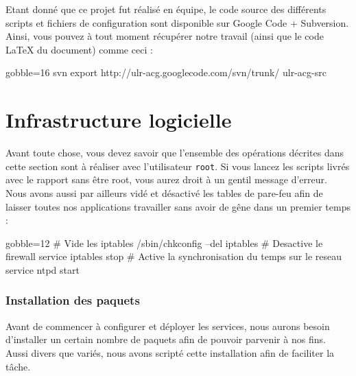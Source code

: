 \documentclass[11pt,a4paper]{report}
\begin{document}
            
            Etant donn\'e que ce projet fut r\'ealis\'e en \'equipe, le code source des diff\'erents scripts et fichiers de configuration sont disponible sur Google Code + Subversion. Ainsi, vous pouvez \`a tout moment r\'ecup\'erer notre travail (ainsi que le code {\LaTeX} du document) comme ceci :\\
            
            \begin{bashcode*}{gobble=16}
                svn export http://ulr-acg.googlecode.com/svn/trunk/ ulr-acg-src
            \end{bashcode*}
            
    \part{Infrastructure logicielle}
        
        Avant toute chose, vous devez savoir que l'ensemble des op\'erations d\'ecrites dans cette section sont \`a r\'ealiser avec l'utilisateur \verb+root+. Si vous lancez les scripts livr\'es avec le rapport sans \^etre root, vous aurez droit \`a un gentil message d'erreur.\\
        
        Nous avons aussi par ailleurs vid\'e et d\'esactiv\'e les tables de pare-feu afin de laisser toutes nos applications travailler sans avoir de g\^ene dans un premier temps :\\
        
        \begin{bashcode*}{gobble=12}
            # Vide les iptables
            /sbin/chkconfig --del iptables
            # Desactive le firewall
            service iptables stop
            # Active la synchronisation du temps sur le reseau
            service ntpd start
        \end{bashcode*}
        
        \section{Installation des paquets}
            
            Avant de commencer \`a configurer et d\'eployer les services, nous aurons besoin d'installer un certain nombre de paquets afin de pouvoir parvenir \`a nos fins. Aussi divers que vari\'es, nous avons script\'e cette installation afin de faciliter la t\^ache.\\
            
\end{document}
